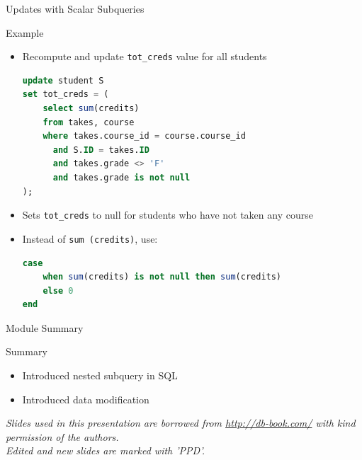 \documentclass[aspectratio=169, xcolor=dvipsnames]{beamer}
\begin{document}
\begin{frame}[fragile]{Updates with Scalar Subqueries}
    \begin{exampleblock}{Example}
        \begin{itemize}[<+->]
            \item Recompute and update \texttt{tot\_creds} value for all students
            \begin{lstlisting}[language=SQL, basicstyle=\ttfamily\scriptsize]
update student S 
set tot_creds = (
    select sum(credits) 
    from takes, course 
    where takes.course_id = course.course_id 
      and S.ID = takes.ID 
      and takes.grade <> 'F' 
      and takes.grade is not null
);
            \end{lstlisting}
            \item Sets \texttt{tot\_creds} to null for students who have not taken any course
            \item Instead of \texttt{sum (credits)}, use:
            \begin{lstlisting}[language=SQL, basicstyle=\ttfamily\scriptsize]
case 
    when sum(credits) is not null then sum(credits) 
    else 0 
end
            \end{lstlisting}
        \end{itemize}
    \end{exampleblock}
\end{frame}

\begin{frame}{Module Summary}
    \begin{block}{Summary}
        \begin{itemize}[<+->]
            \item Introduced nested subquery in SQL
            \item Introduced data modification
        \end{itemize}
    \end{block}
    \vspace{2em}
    \begin{center}
    \small \textit{Slides used in this presentation are borrowed from \url{http://db-book.com/} with kind permission of the authors.} \\
    \small \textit{Edited and new slides are marked with 'PPD'.}
    \end{center}
\end{frame}
\end{document}
